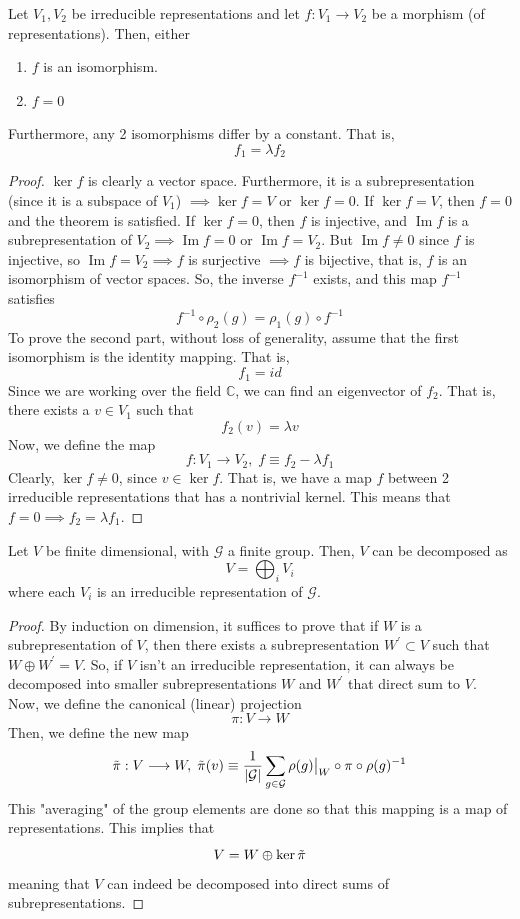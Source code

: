 \documentclass{article}
\DeclareMathOperator{\im}{Im}
\begin{document}
  \begin{lemma}
  Let $V_1, V_2$ be irreducible representations and let $f: V_1 \longrightarrow V_2$ be a morphism (of representations). Then, either
  \begin{enumerate}
      \item $f$ is an isomorphism. 
      \item $f = 0$
  \end{enumerate}
  Furthermore, any 2 isomorphisms differ by a constant. That is, 
  \[f_1 = \lambda f_2\]
  \end{lemma}
  \begin{proof}
  $\ker{f}$ is clearly a vector space. Furthermore, it is a subrepresentation (since it is a subspace of $V_1$) $\implies \ker{f} = V$ or $\ker{f} = 0$. If $\ker{f} = V$, then $f = 0$ and the theorem is satisfied. If $\ker{f} = 0$, then $f$ is injective, and $\im{f}$ is a subrepresentation of $V_2 \implies \im{f} = 0$ or $\im{f} = V_2$. But $\im{f} \neq 0$ since $f$ is injective, so $\im{f} = V_2 \implies f$ is surjective $\implies f$ is bijective, that is, $f$ is an isomorphism of vector spaces. So, the inverse $f^{-1}$ exists, and this map $f^{-1}$ satisfies
  \[f^{-1} \circ \rho_2(g) = \rho_1 (g) \circ f^{-1}\]
  To prove the second part, without loss of generality, assume that the first isomorphism is the identity mapping. That is, 
  \[f_1 = id\]
  Since we are working over the field $\mathbb{C}$, we can find an eigenvector of $f_2$. That is, there exists a $v \in V_1$ such that 
  \[f_2 (v) = \lambda v\]
  Now, we define the map
  \[f: V_1 \longrightarrow V_2, \; f \equiv f_2 - \lambda f_1\]
  Clearly, $\ker{f} \neq 0$, since $v \in \ker{f}$. That is, we have a map $f$ between 2 irreducible representations that has a nontrivial kernel. This means that $f = 0 \implies f_2 = \lambda f_1$.  
  \end{proof}

  \begin{theorem}
  Let $V$ be finite dimensional, with $\mathcal{G}$ a finite group. Then, $V$ can be decomposed as 
  \[V = \bigoplus_{i} V_i\]
  where each $V_i$ is an irreducible representation of $\mathcal{G}$. 
  \end{theorem}
  \begin{proof}
  By induction on dimension, it suffices to prove that if $W$ is a subrepresentation of $V$, then there exists a subrepresentation $W^\prime \subset V$ such that $W \oplus W^\prime = V$. So, if $V$ isn't an irreducible representation, it can always be decomposed into smaller subrepresentations $W$ and $W^\prime$ that direct sum to $V$. Now, we define the canonical (linear) projection 
  \[\pi: V \longrightarrow W\]
  Then, we define the new map 
  \[\Tilde{\pi}: V \longrightarrow W, \; \Tilde{\pi}(v) \equiv \frac{1}{|\mathcal{G}|} \sum_{g \in \mathcal{G}} \rho(g)\big|_W \circ \pi \circ \rho(g)^{-1}\]
  This "averaging" of the group elements are done so that this mapping is a map of representations. This implies that 
  \[V = W \oplus \ker{\Tilde{\pi}}\]
  meaning that $V$ can indeed be decomposed into direct sums of subrepresentations. 
  \end{proof}
\end{document}
